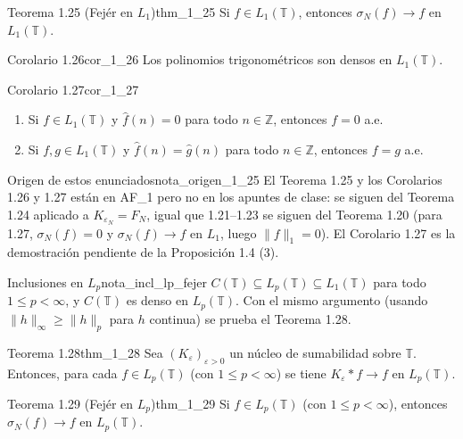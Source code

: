 \begin{teorema}{Teorema 1.25 (Fejér en $L_1$)}{thm_1_25}
Si $f \in L_1(\mathbb{T})$, entonces $\sigma_N(f) \to f$ en $L_1(\mathbb{T})$.
\end{teorema}

\begin{proposicion}{Corolario 1.26}{cor_1_26}
Los polinomios trigonométricos son densos en $L_1(\mathbb{T})$.
\end{proposicion}

\begin{proposicion}{Corolario 1.27}{cor_1_27}
\begin{enumerate}
\item[(1)] Si $f \in L_1(\mathbb{T})$ y $\hat{f}(n) = 0$ para todo $n \in \mathbb{Z}$, entonces $f = 0$ a.e.
\item[(2)] Si $f, g \in L_1(\mathbb{T})$ y $\hat{f}(n) = \hat{g}(n)$ para todo $n \in \mathbb{Z}$, entonces $f = g$ a.e.
\end{enumerate}
\end{proposicion}

\begin{nota}{Origen de estos enunciados}{nota_origen_1_25}
El Teorema 1.25 y los Corolarios 1.26 y 1.27 están en AF\_1 pero no en los apuntes de clase: se siguen del Teorema 1.24 aplicado a $K_{\varepsilon_N} = F_N$, igual que 1.21--1.23 se siguen del Teorema 1.20 (para 1.27, $\sigma_N(f) = 0$ y $\sigma_N(f) \to f$ en $L_1$, luego $\|f\|_1 = 0$). El Corolario 1.27 es la demostración pendiente de la Proposición 1.4 (3).
\end{nota}

\begin{nota}{Inclusiones en $L_p$}{nota_incl_lp_fejer}
$C(\mathbb{T}) \subseteq L_p(\mathbb{T}) \subseteq L_1(\mathbb{T})$ para todo $1 \le p < \infty$, y $C(\mathbb{T})$ es denso en $L_p(\mathbb{T})$. Con el mismo argumento (usando $\|h\|_\infty \ge \|h\|_p$ para $h$ continua) se prueba el Teorema 1.28.
\end{nota}

\begin{teorema}{Teorema 1.28}{thm_1_28}
Sea $(K_\varepsilon)_{\varepsilon>0}$ un núcleo de sumabilidad sobre $\mathbb{T}$. Entonces, para cada $f \in L_p(\mathbb{T})$ (con $1 \le p < \infty$) se tiene $K_\varepsilon * f \to f$ en $L_p(\mathbb{T})$.
\end{teorema}

\begin{teorema}{Teorema 1.29 (Fejér en $L_p$)}{thm_1_29}
Si $f \in L_p(\mathbb{T})$ (con $1 \le p < \infty$), entonces $\sigma_N(f) \to f$ en $L_p(\mathbb{T})$.
\end{teorema}

